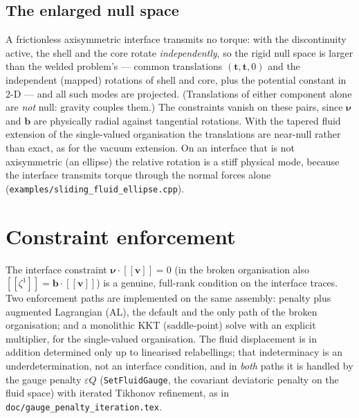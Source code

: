 \documentclass[11pt]{article}
\newcommand{\eps}{\varepsilon}
\newcommand{\bnu}{\bm{\nu}}
\newcommand{\bv}{\mathbf{v}}
\newcommand{\jump}[1]{[\![#1]\!]}
\begin{document}
\subsection{The enlarged null space}

A frictionless axisymmetric interface transmits no torque: with the
discontinuity active, the shell and the core rotate
\emph{independently}, so the rigid null space is larger than the welded
problem's --- common translations $(\mathbf{t}, \mathbf{t}, 0)$ and the
independent (mapped) rotations of shell and core, plus the potential
constant in 2-D --- and all such modes are projected. (Translations of
either component alone are \emph{not} null: gravity couples them.) The
constraints vanish on these pairs, since $\bnu$ and $\mathbf{b}$ are
physically radial against tangential rotations. With the tapered fluid
extension of the single-valued organisation the translations are
near-null rather than exact, as for the vacuum extension. On an
interface that is not axisymmetric (an ellipse) the relative rotation is
a stiff physical mode, because the interface transmits torque through
the normal forces alone (\texttt{examples/sliding\_fluid\_ellipse.cpp}).

\section{Constraint enforcement}
\label{sec:enforce}

The interface constraint $\bnu\cdot\jump{\bv} = 0$ (in the broken
organisation also $\jump{\zeta^1} = \mathbf{b}\cdot\jump{\bv}$) is a
genuine, full-rank condition on the interface traces. Two enforcement
paths are implemented on the same assembly: penalty plus augmented
Lagrangian (AL), the default and the only path of the broken
organisation; and a monolithic KKT (saddle-point) solve with an
explicit multiplier, for the single-valued organisation. The fluid
displacement is in addition determined only up to linearised
relabellings; that indeterminacy is an underdetermination, not an
interface condition, and in \emph{both} paths it is handled by the
gauge penalty $\eps Q$ (\texttt{SetFluidGauge}, the covariant
deviatoric penalty on the fluid space) with iterated Tikhonov
refinement, as in \texttt{doc/gauge\_penalty\_iteration.tex}.
\end{document}
